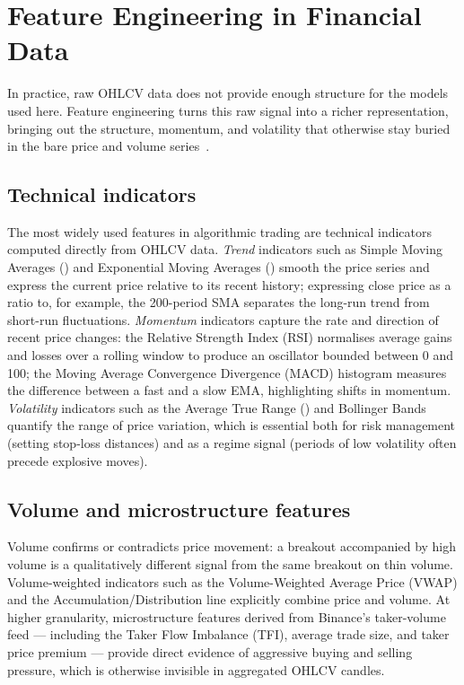 \section{Feature Engineering in Financial Data}

In practice, raw OHLCV data does not provide enough structure for the models used here. Feature engineering turns this raw signal into a richer representation, bringing out the structure, momentum, and volatility that otherwise stay buried in the bare price and volume series~\cite{sonkavde2023forecasting}.

\subsection{Technical indicators}
The most widely used features in algorithmic trading are technical indicators computed directly from OHLCV data. \textit{Trend} indicators such as Simple Moving Averages () and Exponential Moving Averages () smooth the price series and express the current price relative to its recent history; expressing close price as a ratio to, for example, the 200-period SMA separates the long-run trend from short-run fluctuations. \textit{Momentum} indicators capture the rate and direction of recent price changes: the Relative Strength Index (RSI) normalises average gains and losses over a rolling window to produce an oscillator bounded between 0 and 100; the Moving Average Convergence Divergence (MACD) histogram measures the difference between a fast and a slow EMA, highlighting shifts in momentum. \textit{Volatility} indicators such as the Average True Range () and Bollinger Bands quantify the range of price variation, which is essential both for risk management (setting stop-loss distances) and as a regime signal (periods of low volatility often precede explosive moves).

\subsection{Volume and microstructure features}
Volume confirms or contradicts price movement: a breakout accompanied by high volume is a qualitatively different signal from the same breakout on thin volume. Volume-weighted indicators such as the Volume-Weighted Average Price (VWAP) and the Accumulation/Distribution line explicitly combine price and volume. At higher granularity, microstructure features derived from Binance's taker-volume feed — including the Taker Flow Imbalance (TFI), average trade size, and taker price premium — provide direct evidence of aggressive buying and selling pressure, which is otherwise invisible in aggregated OHLCV candles.

